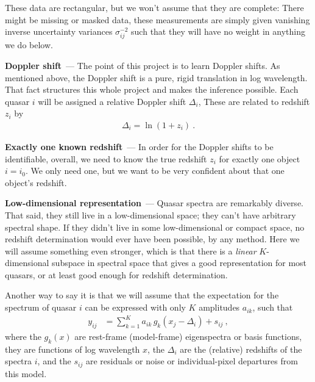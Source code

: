 \documentclass{article}
\renewcommand{\paragraph}[1]{\par\medskip\noindent\textbf{#1}~---}
\begin{document}
These data are rectangular, but we won't assume that they are complete:
There might be missing or masked data, these measurements are simply given vanishing inverse uncertainty variances $\sigma^{-2}_{ij}$ such that they will have no weight in anything we do below.

\paragraph{Doppler shift}
The point of this project is to learn Doppler shifts.
As mentioned above, the Doppler shift is a pure, rigid translation in log wavelength.
That fact structures this whole project and makes the inference possible.
Each quasar $i$ will be assigned a relative Doppler shift $\Delta_i$, 
These are related to redshift $z_i$ by
\begin{align}
    \Delta_i = \ln (1 + z_i) ~.\label{eq:doppler}
\end{align}

\paragraph{Exactly one known redshift}
In order for the Doppler shifts to be identifiable, overall, we need to know the true redshift $z_i$ for exactly one object $i=i_0$.
We only need one, but we want to be very confident about that one object's redshift.

\paragraph{Low-dimensional representation}
Quasar spectra are remarkably diverse.
That said, they still live in a low-dimensional space; they can't have arbitrary spectral shape.
If they didn't live in some low-dimensional or compact space, no redshift determination would ever have been possible, by any method.
Here we will assume something even stronger, which is that there is a \emph{linear} $K$-dimensional subspace in spectral space
that gives a good representation for most quasars, or at least good enough for redshift determination.

Another way to say it is that we will assume that the expectation for the spectrum of quasar $i$ can be expressed with only $K$
amplitudes $a_{ik}$, such that
\begin{align}
    y_{ij} &= \sum_{k=1}^K a_{ik}\,g_k(x_j - \Delta_i) + s_{ij} ~,
\end{align}
where the $g_k(x)$ are rest-frame (model-frame) eigenspectra or basis functions,
they are functions of log wavelength $x$,
the $\Delta_i$ are the (relative) redshifts of the spectra $i$,
and the $s_{ij}$ are residuals or noise or individual-pixel departures from this model.
\end{document}
